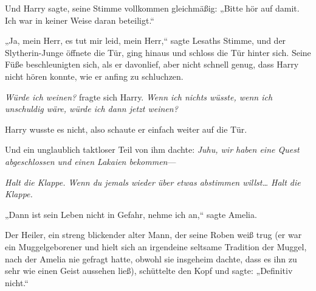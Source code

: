Und Harry sagte, seine Stimme vollkommen gleichmäßig: „Bitte hör auf damit. Ich war in keiner Weise daran beteiligt.“

„Ja, mein Herr, es tut mir leid, mein Herr,“ sagte Lesaths Stimme, und der Slytherin-Junge öffnete die Tür, ging hinaus und schloss die Tür hinter sich. Seine Füße beschleunigten sich, als er davonlief, aber nicht schnell genug, dass Harry nicht hören konnte, wie er anfing zu schluchzen.

\emph{Würde ich weinen?} fragte sich Harry. \emph{Wenn ich nichts wüsste, wenn ich unschuldig wäre, würde ich dann jetzt weinen?}

Harry wusste es nicht, also schaute er einfach weiter auf die Tür.

Und ein unglaublich taktloser Teil von ihm dachte: \emph{Juhu, wir haben eine Quest abgeschlossen und einen Lakaien bekommen}—

\emph{Halt die Klappe. Wenn du jemals wieder über etwas abstimmen willst… Halt die Klappe.}


„Dann ist sein Leben nicht in Gefahr, nehme ich an,“ sagte Amelia.

Der Heiler, ein streng blickender alter Mann, der seine Roben weiß trug (er war ein Muggelgeborener und hielt sich an irgendeine seltsame Tradition der Muggel, nach der Amelia nie gefragt hatte, obwohl sie insgeheim dachte, dass es ihn zu sehr wie einen Geist aussehen ließ), schüttelte den Kopf und sagte: „Definitiv nicht.“

